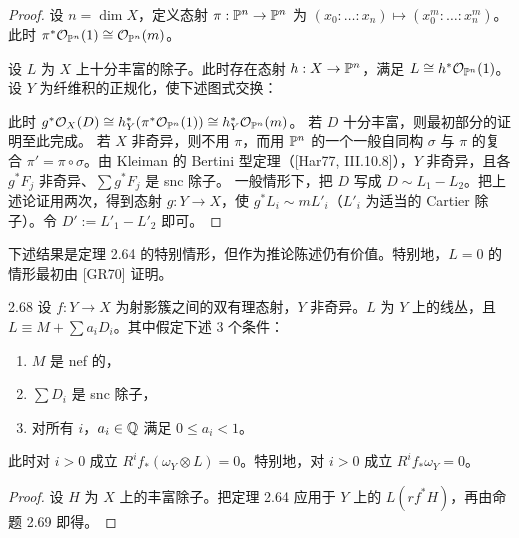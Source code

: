 \begin{proof}
设 $n=\dim X$，定义态射 $\pi:\mathbb{P}^n\to\mathbb{P}^n$ 为 $(x_0:\dots:x_n)\mapsto(x_0^m:\dots:x_n^m)$。此时 $\pi^*\mathcal{O}_{\mathbb{P}^n}(1)\cong\mathcal{O}_{\mathbb{P}^n}(m)$。

设 $L$ 为 $X$ 上十分丰富的除子。此时存在态射 $h:X\to\mathbb{P}^n$，满足 $L\cong h^*\mathcal{O}_{\mathbb{P}^n}(1)$。设 $Y$ 为纤维积的正规化，使下述图式交换：

此时 $g^*\mathcal{O}_X(D)\cong h_Y^*(\pi^*\mathcal{O}_{\mathbb{P}^n}(1))\cong h_Y^*\mathcal{O}_{\mathbb{P}^n}(m)$。
若 $D$ 十分丰富，则最初部分的证明至此完成。
若 $X$ 非奇异，则不用 $\pi$，而用 $\mathbb{P}^n$ 的一个一般自同构 $\sigma$ 与 $\pi$ 的复合 $\pi'=\pi\circ\sigma$。由 Kleiman 的 Bertini 型定理（[Har77, III.10.8]），$Y$ 非奇异，且各 $g^*F_j$ 非奇异、$\sum g^*F_j$ 是 snc 除子。
一般情形下，把 $D$ 写成 $D\sim L_1-L_2$。把上述论证用两次，得到态射 $g:Y\to X$，使 $g^*L_i\sim mL'_i$（$L'_i$ 为适当的 Cartier 除子）。令 $D':=L'_1-L'_2$ 即可。
\end{proof}

下述结果是定理 2.64 的特别情形，但作为推论陈述仍有价值。特别地，$L=0$ 的情形最初由 [GR70] 证明。

\begin{corollaryp}{2.68}
设 $f:Y\to X$ 为射影簇之间的双有理态射，$Y$ 非奇异。$L$ 为 $Y$ 上的线丛，且 $L\equiv M+\sum a_iD_i$。其中假定下述 3 个条件：
\begin{enumerate}[label=（\arabic*）,leftmargin=2.8em]
\item $M$ 是 nef 的，
\item $\sum D_i$ 是 snc 除子，
\item 对所有 $i$，$a_i\in\mathbb{Q}$ 满足 $0\le a_i<1$。
\end{enumerate}
此时对 $i>0$ 成立 $R^if_*(\omega_Y\otimes L)=0$。特别地，对 $i>0$ 成立 $R^if_*\omega_Y=0$。
\end{corollaryp}

\begin{proof}
设 $H$ 为 $X$ 上的丰富除子。把定理 2.64 应用于 $Y$ 上的 $L(rf^*H)$，再由命题 2.69 即得。
\end{proof}


